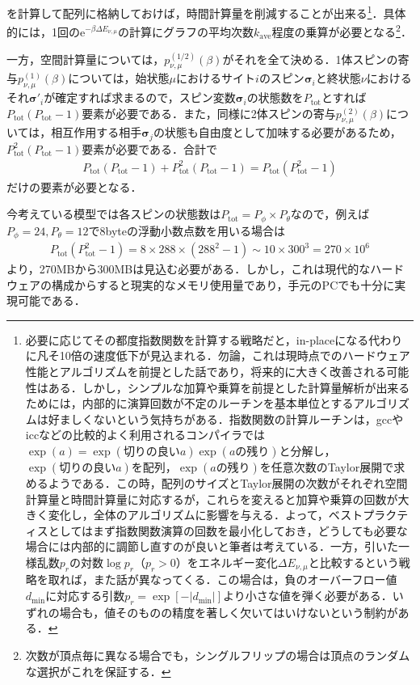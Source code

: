 \documentclass[a4,10pt, platex, dvipdfmx]{jsarticle}
\newcommand{\spin}{\bm{\sigma}}
\begin{document}
    を計算して配列に格納しておけば，時間計算量を削減することが出来る\footnote{必要に応じてその都度指数関数を計算する戦略だと，in-placeになる代わりに凡そ10倍の速度低下が見込まれる．勿論，これは現時点でのハードウェア性能とアルゴリズムを前提とした話であり，将来的に大きく改善される可能性はある．しかし，シンプルな加算や乗算を前提とした計算量解析が出来るためには，内部的に演算回数が不定のルーチンを基本単位とするアルゴリズムは好ましくないという気持ちがある．指数関数の計算ルーチンは，gccやiccなどの比較的よく利用されるコンパイラでは$\exp(a) = \exp(\text{切りの良い$a$})\exp(\text{$a$の残り})$と分解し，$\exp(\text{切りの良い$a$})$を配列，$\exp(\text{$a$の残り})$を任意次数のTaylor展開で求めるようである\cite{Mitsunari2011}．この時，配列のサイズとTaylor展開の次数がそれぞれ空間計算量と時間計算量に対応するが，これらを変えると加算や乗算の回数が大きく変化し，全体のアルゴリズムに影響を与える．よって，ベストプラクティスとしてはまず指数関数演算の回数を最小化しておき，どうしても必要な場合には内部的に調節し直すのが良いと筆者は考えている．一方，引いた一様乱数$p_{r}$の対数$\log p_{r}$（$p_{r} > 0$）をエネルギー変化$\Delta E_{\nu, \mu}$と比較するという戦略を取れば，また話が異なってくる．この場合は，負のオーバーフロー値$d_{\mathrm{min}}$に対応する引数$p_{r} = \exp[-|d_{\mathrm{min}}|]$より小さな値を弾く必要がある．いずれの場合も，値そのものの精度を著しく欠いてはいけないという制約がある．}．具体的には，1回の$\mathrm{e}^{-\beta \Delta E_{\nu, \mu}}$の計算にグラフの平均次数$k_{\mathrm{ave}}$程度の乗算が必要となる\footnote{次数が頂点毎に異なる場合でも，シングルフリップの場合は頂点のランダムな選択がこれを保証する．}．

    一方，空間計算量については，$p^{(1/2)}_{\nu,\mu}(\beta)$がそれを全て決める．1体スピンの寄与$p^{(1)}_{\nu,\mu}(\beta)$については，始状態$\mu$におけるサイト$i$のスピン$\spin_{i}$と終状態$\nu$におけるそれ$\spin'_{i}$が確定すれば求まるので，スピン変数$\spin_{i}$の状態数を$P_{\mathrm{tot}}$とすれば$P_{\mathrm{tot}}(P_{\mathrm{tot}} - 1)$要素が必要である．また，同様に2体スピンの寄与$p^{(2)}_{\nu,\mu}(\beta)$については，相互作用する相手$\spin_{j}$の状態も自由度として加味する必要があるため，$P^{2}_{\mathrm{tot}}(P_{\mathrm{tot}} - 1)$要素が必要である．合計で
    \begin{align}
        P_{\mathrm{tot}}(P_{\mathrm{tot}} - 1) + P^{2}_{\mathrm{tot}}(P_{\mathrm{tot}} - 1) = P_{\mathrm{tot}} (P^{2}_{\mathrm{tot}} - 1)
    \end{align}
    だけの要素が必要となる．

    今考えている模型では各スピンの状態数は$P_{\mathrm{tot}} = P_{\phi}\times P_{\theta}$なので，例えば$P_{\phi} = 24, P_{\theta} = 12$で8byteの浮動小数点数を用いる場合は
    \begin{align}
        P_{\mathrm{tot}} (P^{2}_{\mathrm{tot}} - 1) = 8 \times 288 \times (288^{2} - 1) \sim 10 \times 300^{3} = 270 \times 10^{6}
    \end{align}
    より，270MBから300MBは見込む必要がある．しかし，これは現代的なハードウェアの構成からすると現実的なメモリ使用量であり，手元のPCでも十分に実現可能である．
\end{document}
